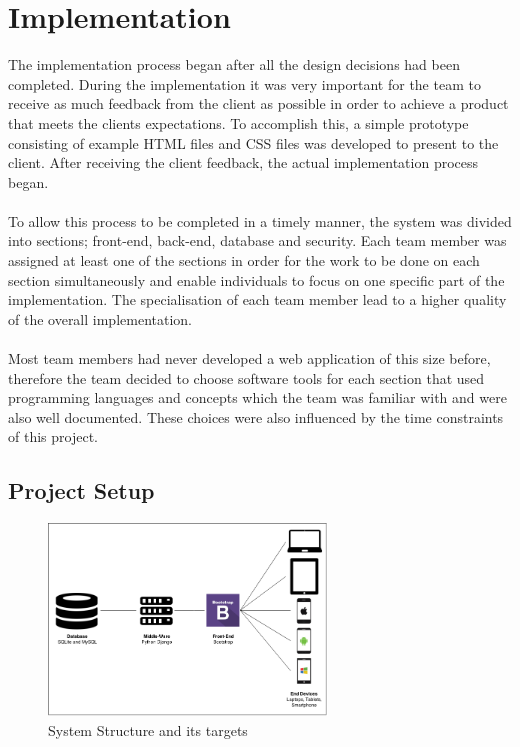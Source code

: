\documentclass{l3proj}
\begin{document}
\chapter{Implementation}
\label{impl}
The implementation process began after all the design decisions had been completed. During the implementation it was very important for the team to receive as much feedback from the client as possible in order to achieve a product that meets the clients expectations. To accomplish this, a simple prototype consisting of example HTML files and CSS files was developed to present to the client. After receiving the client feedback, the actual implementation process began.\\
\\To allow this process to be completed in a timely manner, the system was divided into sections; front-end, back-end, database and security. Each team member was assigned  at least one of the sections in order for the work to be done on each section simultaneously and enable individuals to focus on one specific part of the implementation. The specialisation of each team member lead to a higher quality of the overall implementation.\\
\\Most team members had never developed a web application of this size before, therefore the team decided to choose software tools for each section that used programming languages and concepts which the team was familiar with and were also well documented. These choices were also influenced by the time constraints of this project.
\section{Project Setup}
{
\begin{figure}[h]
\caption{System Structure and its targets}
\centering
\includegraphics[width=7.4cm]{SystemStructure.png}
\end{figure}
}
\end{document}
